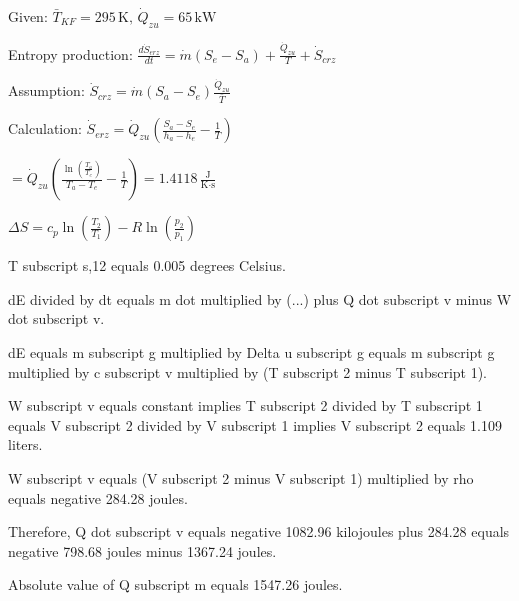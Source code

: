 Given:  
\( \bar{T}_{KF} = 295 \, \text{K}, \, \dot{Q}_{zu} = 65 \, \text{kW} \)  

Entropy production:  
\( \frac{d\dot{S}_{erz}}{dt} = \dot{m} (S_e - S_a) + \frac{\dot{Q}_{zu}}{T} + \dot{S}_{crz} \)  

Assumption:  
\( \dot{S}_{crz} = \dot{m} (S_a - S_e) \frac{\dot{Q}_{zu}}{\bar{T}} \)  

Calculation:  
\( \dot{S}_{erz} = \dot{Q}_{zu} \left( \frac{S_a - S_e}{h_a - h_e} - \frac{1}{T} \right) \)  

\( = \dot{Q}_{zu} \left( \frac{\ln \left( \frac{T_a}{T_e} \right)}{T_a - T_e} - \frac{1}{T} \right) = 1.4118 \, \frac{\text{J}}{\text{K·s}} \)  

\( \Delta S = c_p \ln \left( \frac{T_2}{T_1} \right) - R \ln \left( \frac{p_2}{p_1} \right) \)

T subscript s,12 equals 0.005 degrees Celsius.  

dE divided by dt equals m dot multiplied by (...) plus Q dot subscript v minus W dot subscript v.  

dE equals m subscript g multiplied by Delta u subscript g equals m subscript g multiplied by c subscript v multiplied by (T subscript 2 minus T subscript 1).  

W subscript v equals constant implies T subscript 2 divided by T subscript 1 equals V subscript 2 divided by V subscript 1 implies V subscript 2 equals 1.109 liters.  

W subscript v equals (V subscript 2 minus V subscript 1) multiplied by rho equals negative 284.28 joules.  

Therefore, Q dot subscript v equals negative 1082.96 kilojoules plus 284.28 equals negative 798.68 joules minus 1367.24 joules.  

Absolute value of Q subscript m equals 1547.26 joules.